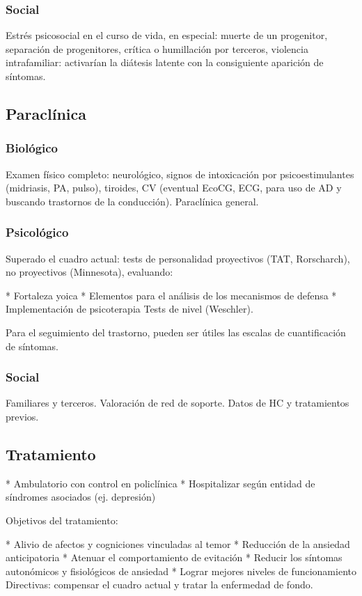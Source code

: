 \subsubsection*{Social}

Estrés psicosocial en el curso de vida, en especial: muerte de un progenitor, separación de progenitores, crítica o humillación por terceros, violencia intrafamiliar: activarían la diátesis latente con la consiguiente aparición de síntomas.

\subsection*{Paraclínica}
\subsubsection*{Biológico}
Examen físico completo: neurológico, signos de intoxicación por psicoestimulantes (midriasis, PA, pulso), tiroides, CV (eventual EcoCG, ECG, para uso de AD y buscando trastornos de la conducción). Paraclínica general.
\subsubsection*{Psicológico}
Superado el cuadro actual: tests de personalidad proyectivos (TAT, Rorscharch), no proyectivos (Minnesota), evaluando:

* Fortaleza yoica
* Elementos para el análisis de los mecanismos de defensa
* Implementación de psicoterapia Tests de nivel (Weschler).

Para el seguimiento del trastorno, pueden ser útiles las escalas de cuantificación de síntomas.
\subsubsection*{Social}
Familiares y terceros. Valoración de red de soporte. Datos de HC y tratamientos previos.
\subsection*{Tratamiento}
* Ambulatorio con control en policlínica
* Hospitalizar según entidad de síndromes asociados (ej. depresión)

Objetivos del tratamiento:

* Alivio de afectos y cogniciones vinculadas al temor
* Reducción de la ansiedad anticipatoria
* Atenuar el comportamiento de evitación
* Reducir los síntomas autonómicos y fisiológicos de ansiedad
* Lograr mejores niveles de funcionamiento Directivas: compensar el cuadro actual y tratar la enfermedad de fondo.
